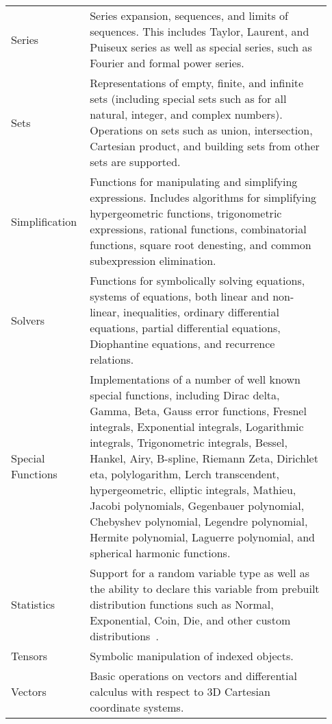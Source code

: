 \begin{longtable}[htbc]{p{0.20\linewidth}p{0.73\linewidth}}
Series & Series expansion, sequences, and limits of sequences.
This includes Taylor, Laurent, and Puiseux series as well as special series, such
as Fourier and formal power series.\\

Sets & Representations of empty, finite, and infinite sets (including
special sets such as for all natural, integer, and complex numbers). Operations
on sets such as union, intersection, Cartesian product, and building sets from
other sets are supported.\\

Simplification & Functions for manipulating and simplifying expressions.
Includes algorithms for simplifying hypergeometric functions, trigonometric
expressions, rational functions, combinatorial functions, square root
denesting, and common subexpression elimination.\\

Solvers & Functions for symbolically solving equations, systems
of equations, both linear and non-linear, inequalities, ordinary differential
equations, partial differential equations, Diophantine equations, and
recurrence relations.\\

Special Functions & Implementations of a number of well known special functions,
including Dirac delta, Gamma, Beta, Gauss error functions, Fresnel integrals,
Exponential integrals, Logarithmic integrals, Trigonometric integrals, Bessel,
Hankel, Airy, B-spline, Riemann Zeta, Dirichlet eta, polylogarithm, Lerch
transcendent, hypergeometric, elliptic integrals, Mathieu, Jacobi polynomials,
Gegenbauer polynomial, Chebyshev polynomial, Legendre polynomial, Hermite
polynomial, Laguerre polynomial, and
spherical harmonic functions.\\

Statistics & Support for a random variable type as well as the ability to
declare this variable from prebuilt distribution functions such as
Normal, Exponential, Coin, Die, and other custom distributions~\cite{StatsMRocklin}.\\

Tensors & Symbolic manipulation of indexed objects.\\

Vectors & Basic operations on vectors and differential calculus with respect
to 3D Cartesian coordinate systems.\\
\bottomrule

\end{longtable}

